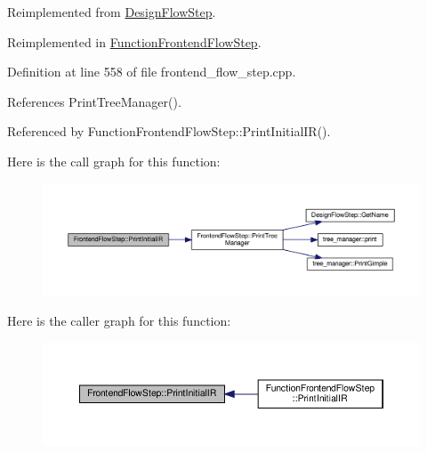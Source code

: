 Reimplemented from \hyperlink{classDesignFlowStep_a2a169bd0ac5fe3cd5179871714cbe1ab}{Design\+Flow\+Step}.



Reimplemented in \hyperlink{classFunctionFrontendFlowStep_a65cf8273a7a4f4bc3ed85c04220349ad}{Function\+Frontend\+Flow\+Step}.



Definition at line 558 of file frontend\+\_\+flow\+\_\+step.\+cpp.



References Print\+Tree\+Manager().



Referenced by Function\+Frontend\+Flow\+Step\+::\+Print\+Initial\+I\+R().

Here is the call graph for this function\+:
\nopagebreak
\begin{figure}[H]
\begin{center}
\leavevmode
\includegraphics[width=350pt]{d9/d37/classFrontendFlowStep_aa4082589c5838cc22e2b4ea7097b5c16_cgraph}
\end{center}
\end{figure}
Here is the caller graph for this function\+:
\nopagebreak
\begin{figure}[H]
\begin{center}
\leavevmode
\includegraphics[width=350pt]{d9/d37/classFrontendFlowStep_aa4082589c5838cc22e2b4ea7097b5c16_icgraph}
\end{center}
\end{figure}
\mbox{\label{classFrontendFlowStep_a2d170a44221abe07d4186a3a00bee56b}} 
